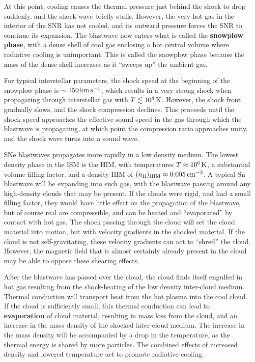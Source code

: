 \documentclass[a4paper,10pt]{article}
\begin{document}
{\noindent}At this point, cooling causes the thermal pressure just behind the shock to drop suddenly, and the shock wave briefly stalls. However, the very hot gas in the interior of the SNR has not cooled, and its outward pressure forces the SNR to continue its expansion. The blastwave now enters what is called the \textbf{snowplow phase}, with a dense shell of cool gas enclosing a hot central volume where radiative cooling is unimportant. This is called the snowplow phase because the mass of the dense shell increases as it ``sweeps up'' the ambient gas.

{\noindent}For typical interstellar parameters, the shock speed at the beginning of the snowplow phase is $\sim150\,{\rm km\,s^{-1}}$, which results in a very strong shock when propagating through interstellar gas with $T\lesssim10^4\,{\rm K}$. However, the shock front gradually slows, and the shock compression declines. This proceeds until the shock speed approaches the effective sound speed in the gas through which the blastwave is propagating, at which point the compression ratio approaches unity, and the shock wave turns into a sound wave.

{\noindent}SNe blastwaves propagates more rapidly in a low density medium. The lowest density phase in the ISM is the HIM, with temperatures $T\approx10^6\,{\rm K}$, a substantial volume filling factor, and a density HIM  of $(n_{\rm H})_{\rm HIM}\approx0.005\,{\rm cm^{-3}}$. A typical Sn blastwave will be expanding into such gas, with the blastwave passing around any high-density clouds that may be present. If the clouds were rigid, and had a small filling factor, they would have little effect on the propagation of the blastwave, but of course real are compressible, and can be heated and ``evaporated'' by contact with hot gas. The shock passing through the cloud will set the cloud material into motion, but with velocity gradients in the shocked material. If the cloud is not self-gravitating, these velocity gradients can act to ``shred'' the cloud. However, the magnetic field that is almost certainly already present in the cloud may be able to oppose these shearing effects.

{\noindent}After the blastwave has passed over the cloud, the cloud finds itself engulfed in hot gas resulting from the shock-heating of the low density inter-cloud medium. Thermal conduction will transport heat from the hot plasma into the cool cloud. If the cloud is sufficiently small, this thermal conduction can lead to \textbf{evaporation} of cloud material, resulting in mass loss from the cloud, and an increase in the mass density of the shocked inter-cloud medium. The increase in the mass density will be accompanied by a drop in the temperature, as the thermal energy is shared by more particles. The combined effects of increased density and lowered temperature act to promote radiative cooling.
\end{document}
